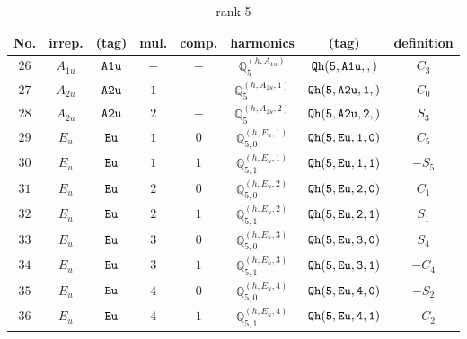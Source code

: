 \documentclass[fleqn,8pt]{jsarticle}
\begin{document}
\begin{table}[ht!]
\begin{center}
\caption{rank 5}
\renewcommand{\arraystretch}{1.3}
\begin{tabular}{cccccccc} \hline \hline
No. & irrep. & (tag) & mul. & comp. & harmonics & (tag) & definition \\ \hline
$ 26 $ & $ A_{1u} $ & $ {\tt A1u} $ & $ - $ & $ - $ & $ \mathbb{Q}_{5}^{(h,A_{1u})} $ & $ {\tt Qh(5,A1u,,)} $ & $ C_{3} $ \\
$ 27 $ & $ A_{2u} $ & $ {\tt A2u} $ & $ 1 $ & $ - $ & $ \mathbb{Q}_{5}^{(h,A_{2u},1)} $ & $ {\tt Qh(5,A2u,1,)} $ & $ C_{0} $ \\
$ 28 $ & $ A_{2u} $ & $ {\tt A2u} $ & $ 2 $ & $ - $ & $ \mathbb{Q}_{5}^{(h,A_{2u},2)} $ & $ {\tt Qh(5,A2u,2,)} $ & $ S_{3} $ \\
$ 29 $ & $ E_{u} $ & $ {\tt Eu} $ & $ 1 $ & $ 0 $ & $ \mathbb{Q}_{5,0}^{(h,E_{u},1)} $ & $ {\tt Qh(5,Eu,1,0)} $ & $ C_{5} $ \\
$ 30 $ & $ E_{u} $ & $ {\tt Eu} $ & $ 1 $ & $ 1 $ & $ \mathbb{Q}_{5,1}^{(h,E_{u},1)} $ & $ {\tt Qh(5,Eu,1,1)} $ & $ - S_{5} $ \\
$ 31 $ & $ E_{u} $ & $ {\tt Eu} $ & $ 2 $ & $ 0 $ & $ \mathbb{Q}_{5,0}^{(h,E_{u},2)} $ & $ {\tt Qh(5,Eu,2,0)} $ & $ C_{1} $ \\
$ 32 $ & $ E_{u} $ & $ {\tt Eu} $ & $ 2 $ & $ 1 $ & $ \mathbb{Q}_{5,1}^{(h,E_{u},2)} $ & $ {\tt Qh(5,Eu,2,1)} $ & $ S_{1} $ \\
$ 33 $ & $ E_{u} $ & $ {\tt Eu} $ & $ 3 $ & $ 0 $ & $ \mathbb{Q}_{5,0}^{(h,E_{u},3)} $ & $ {\tt Qh(5,Eu,3,0)} $ & $ S_{4} $ \\
$ 34 $ & $ E_{u} $ & $ {\tt Eu} $ & $ 3 $ & $ 1 $ & $ \mathbb{Q}_{5,1}^{(h,E_{u},3)} $ & $ {\tt Qh(5,Eu,3,1)} $ & $ - C_{4} $ \\
$ 35 $ & $ E_{u} $ & $ {\tt Eu} $ & $ 4 $ & $ 0 $ & $ \mathbb{Q}_{5,0}^{(h,E_{u},4)} $ & $ {\tt Qh(5,Eu,4,0)} $ & $ - S_{2} $ \\
$ 36 $ & $ E_{u} $ & $ {\tt Eu} $ & $ 4 $ & $ 1 $ & $ \mathbb{Q}_{5,1}^{(h,E_{u},4)} $ & $ {\tt Qh(5,Eu,4,1)} $ & $ - C_{2} $ \\
 \hline \hline
\end{tabular}
\end{center}
\end{table}
\end{document}
